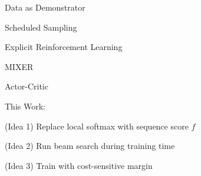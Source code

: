 \documentclass{beamer}
\let\tempone\itemize
\let\temptwo\enditemize
\renewenvironment{itemize}{\tempone\addtolength{\itemsep}{0.5\baselineskip}}{\temptwo}
\newcommand{\air}{\vspace{0.25cm}}
\newcommand{\Cite}[1]{{\footnotesize \citep{#1}}}
\begin{document}
\begin{frame}
  \centerline{ }
  \air 
  \begin{itemize}
  \item Data as Demonstrator \Cite{Venkatraman}
  \item Scheduled Sampling \Cite{Bengio2015}
  \end{itemize}
  \air 

  \centerline{Explicit Reinforcement Learning}
  \air 
  \begin{itemize}
  \item MIXER \Cite{Ranzato2016}
  \item Actor-Critic \Cite{Bahdanau2016}
  \end{itemize}
  


\end{frame}


\begin{frame}
  \begin{center}
    This Work: 
  \end{center}


  
  \begin{itemize}

  \item (Idea 1) Replace local softmax with sequence score $f$ 
    \air 
  \item (Idea 2) Run beam search during training time
    \air 

  \item (Idea 3) Train with cost-sensitive margin 
  \end{itemize}
\end{frame}
\end{document}
